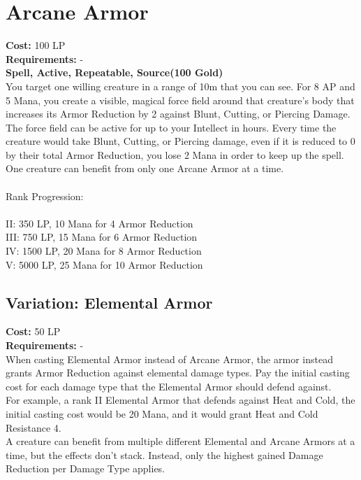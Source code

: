 \section{Arcane Armor}\label{spell:arcaneArmor}
\textbf{Cost:} 100 LP\\
\textbf{Requirements:} -\\
\textbf{Spell, Active, Repeatable, Source(100 Gold)}\\
You target one willing creature in a range of 10m that you can see.
For 8 AP and 5 Mana, you create a visible, magical force field around that creature's body that increases its Armor Reduction by 2 against Blunt, Cutting, or Piercing Damage.
The force field can be active for up to your Intellect in hours.
Every time the creature would take Blunt, Cutting, or Piercing damage, even if it is reduced to 0 by their total Armor Reduction, you lose 2 Mana in order to keep up the spell.
One creature can benefit from only one Arcane Armor at a time.\\
\\
Rank Progression:\\
\\
II: 350 LP, 10 Mana for 4 Armor Reduction\\
III: 750 LP, 15 Mana for 6 Armor Reduction\\
IV: 1500 LP, 20 Mana for 8 Armor Reduction\\
V: 5000 LP, 25 Mana for 10 Armor Reduction\\

\subsection{Variation: Elemental Armor}\label{spell:elementalArmor}
\textbf{Cost:} 50 LP\\
\textbf{Requirements:} -\\
When casting Elemental Armor instead of Arcane Armor, the armor instead grants Armor Reduction against elemental damage types.
Pay the initial casting cost for each damage type that the Elemental Armor should defend against.\\
For example, a rank II Elemental Armor that defends against Heat and Cold, the initial casting cost would be 20 Mana, and it would grant Heat and Cold Resistance 4.\\
A creature can benefit from multiple different Elemental and Arcane Armors at a time, but the effects don't stack.
Instead, only the highest gained Damage Reduction per Damage Type applies.